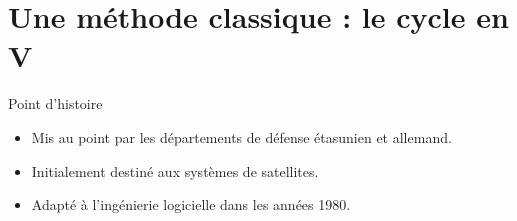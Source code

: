 \section{Une méthode classique : le cycle en V}

\begin{frame}{Point d’histoire}
    \begin{itemize}
        \item Mis au point par les départements de défense étasunien et allemand.
        \item Initialement destiné aux systèmes de satellites.
        \item Adapté à l’ingénierie logicielle dans les années 1980.
    \end{itemize}
\end{frame}

